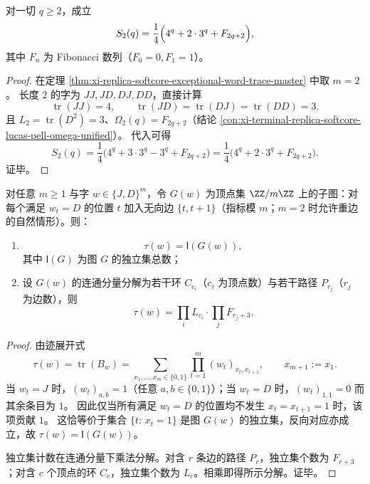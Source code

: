 \begin{corollary}[二次幂和的闭式补全]\label{cor:xi-replica-softcore-exceptional-power-sum-m2-completion}
对一切 \(q\ge 2\)，成立
\[
S_2(q)=\frac14\Bigl(4^q+2\cdot 3^q+F_{2q+2}\Bigr),
\]
其中 \(F_n\) 为 Fibonacci 数列（\(F_0=0,F_1=1\)）。
\end{corollary}
\begin{proof}
在定理 \ref{thm:xi-replica-softcore-exceptional-word-trace-master} 中取 \(m=2\)。
长度 \(2\) 的字为 \(JJ,JD,DJ,DD\)，直接计算
\[
\operatorname{tr}(JJ)=4,\qquad
\operatorname{tr}(JD)=\operatorname{tr}(DJ)=\operatorname{tr}(DD)=3.
\]
且 \(L_2=\operatorname{tr}(D^2)=3\)、\(\Omega_2(q)=F_{2q+2}\)（结论 \ref{con:xi-terminal-replica-softcore-lucas-pell-omega-unified}）。
代入可得
\[
S_2(q)=\frac1{4}\bigl(4^q+3\cdot 3^q-3^q+F_{2q+2}\bigr)
=\frac14\bigl(4^q+2\cdot 3^q+F_{2q+2}\bigr).
\]
证毕。
\end{proof}

\begin{theorem}\label{thm:xi-replica-softcore-wordtrace-independent-set-factorization}
对任意 \(m\ge 1\) 与字 \(w\in\{J,D\}^m\)，令 \(G(w)\) 为顶点集 \(\ZZ/m\ZZ\) 上的子图：对每个满足 \(w_t=D\) 的位置 \(t\) 加入无向边 \(\{t,t+1\}\)（指标模 \(m\)；\(m=2\) 时允许重边的自然情形）。则：
\begin{enumerate}
  \item \[
  \tau(w)=\mathsf{I}(G(w)),
  \]
  其中 \(\mathsf{I}(G)\) 为图 \(G\) 的独立集总数；
  \item 设 \(G(w)\) 的连通分量分解为若干环 \(C_{c_i}\)（\(c_i\) 为顶点数）与若干路径 \(P_{r_j}\)（\(r_j\) 为边数），则
  \[
  \tau(w)=\prod_i L_{c_i}\cdot\prod_j F_{r_j+3}.
  \]
\end{enumerate}
\end{theorem}
\begin{proof}
由迹展开式
\[
\tau(w)=\operatorname{tr}(B_w)
=\sum_{x_1,\dots,x_m\in\{0,1\}}
\prod_{t=1}^{m}(w_t)_{x_t,x_{t+1}},
\qquad x_{m+1}:=x_1.
\]
当 \(w_t=J\) 时，\((w_t)_{a,b}=1\)（任意 \(a,b\in\{0,1\}\)）；当 \(w_t=D\) 时，\((w_t)_{1,1}=0\) 而其余条目为 \(1\)。
因此仅当所有满足 \(w_t=D\) 的位置均不发生 \(x_t=x_{t+1}=1\) 时，该项贡献 \(1\)。
这恰等价于集合 \(\{t:\,x_t=1\}\) 是图 \(G(w)\) 的独立集，反向对应亦成立，故 \(\tau(w)=\mathsf{I}(G(w))\)。

独立集计数在连通分量下乘法分解。对含 \(r\) 条边的路径 \(P_r\)，独立集个数为 \(F_{r+3}\)；对含 \(c\) 个顶点的环 \(C_c\)，独立集个数为 \(L_c\)。相乘即得所示分解。证毕。
\end{proof}

